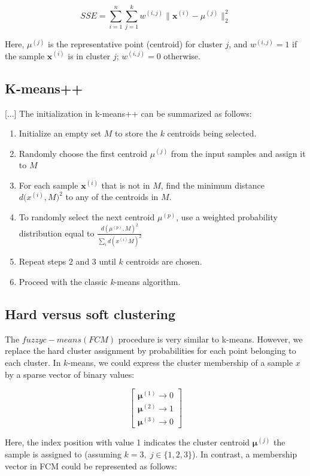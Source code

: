 \documentclass[letterpaper]{report}
\begin{document}
\[
SSE = \sum_{i=1}^{n} \sum^{k}_{j=1} w^{(i, j)} \big \lVert \mathbf{x}^{(i)} - \mu^{(j)} \big \rVert^{2}_{2}
\]

Here, $\mu^{(j)}$ is the representative point (centroid) for cluster $j$, and $w^{(i, j)} = 1$ if the sample $\mathbf{x}^{(i)}$ is in cluster $j$; $w^{(i, j)}=0$ otherwise.

\subsection{K-means++}

[...] The initialization in k-means++ can be summarized as follows:
\begin{enumerate}
\item Initialize an empty set $M$ to store the $k$ centroids being selected.
\item Randomly choose the first centroid $\mu^{(j)}$ from the input samples and assign it to $M$
\item For each sample $\mathbf{x}^{(i)}$ that is not in $M$, find the minimum distance $d \big( x^{(i)}, M \big)^2$ to any of the centroids in $M$.
\item To randomly select the next centroid $\mu^{(p)}$, use a weighted probability distribution equal to $\frac{d(\mu^{(p)}, M)^2 }{\sum_i d(x^{(i)}M)^2}$
\item Repeat steps 2 and 3 until $k$ centroids are chosen.
\item Proceed with the classic \textit{k}-means algorithm.
\end{enumerate}

\subsection{Hard versus soft clustering}

The $fuzzy c-means (FCM)$ procedure is very similar to k-means. However, we replace the hard cluster assignment by probabilities for each point belonging to each cluster. In $k$-means, we could express the cluster membership of a sample $x$ by a sparse vector of binary values:

\[
\begin{bmatrix}
\mathbf{\mu}^{(1)} \rightarrow 0 \\
\mathbf{\mu}^{(2)} \rightarrow 1 \\
\mathbf{\mu}^{(3)} \rightarrow 0 
\end{bmatrix}
\]

Here, the index position with value 1 indicates the cluster centroid $\mathbf{\mu}^{(j)}$ the sample is assigned to (assuming $k=3, \; j \in \{ 1, 2, 3 \}$). In contrast, a membership vector in FCM could be represented as follows:
\end{document}
